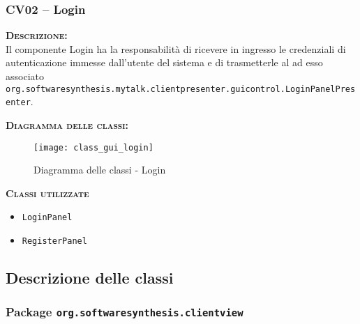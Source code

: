 \subsubsection{CV02 -- Login}\label{sec:cv02}
\begin{description}
  \item{\scshape\bfseries Descrizione:}\\
Il componente \textsf{Login} ha la responsabilità di ricevere in ingresso le credenziali di autenticazione immesse dall'utente del sistema e di trasmetterle al  ad esso associato \texttt{org.softwaresynthesis.mytalk.clientpresenter.guicontrol.LoginPanelPresenter}.

	\item{\scshape\bfseries Diagramma delle classi:}
  \begin{figure}[H]
    \centering
    \texttt{[image: class\_gui\_login]}
    \caption{Diagramma delle classi - Login}\label{fig:login}
  \end{figure}

  \item{\scshape\bfseries Classi utilizzate}
  \begin{itemize}[noitemsep,nolistsep]
    \item \texttt{LoginPanel}
    \item \texttt{RegisterPanel}
  \end{itemize}

\end{description}

\subsection{Descrizione delle classi}

\subsubsection{Package \texttt{org.softwaresynthesis.clientview}}

